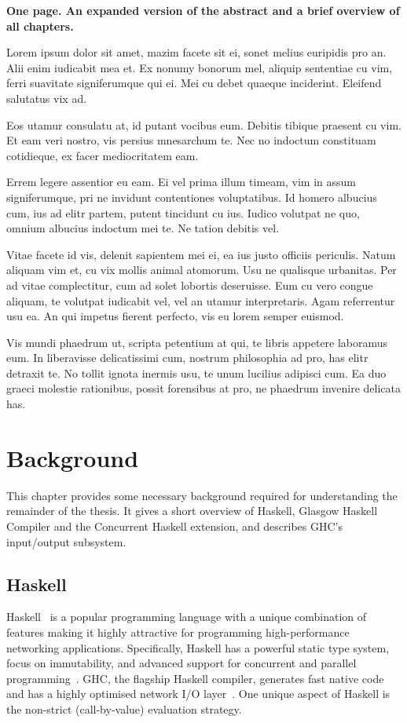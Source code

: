 \documentclass[a4paper,11pt,oneside]{report}
\begin{document}
\textbf{One page. An expanded version of the abstract and a brief overview of
  all chapters.}

Lorem ipsum dolor sit amet, mazim facete sit ei, sonet melius euripidis pro
an. Alii enim iudicabit mea et. Ex nonumy bonorum mel, aliquip sententiae cu
vim, ferri suavitate signiferumque qui ei. Mei cu debet quaeque
inciderint. Eleifend salutatus vix ad.

Eos utamur consulatu at, id putant vocibus eum. Debitis tibique praesent cu
vim. Et eam veri nostro, vis persius mnesarchum te. Nec no indoctum constituam
cotidieque, ex facer mediocritatem eam.

Errem legere assentior eu eam. Ei vel prima illum timeam, vim in assum
signiferumque, pri ne invidunt contentiones voluptatibus. Id homero albucius
cum, ius ad elitr partem, putent tincidunt cu ius. Iudico volutpat ne quo,
omnium albucius indoctum mei te. Ne tation debitis vel.

Vitae facete id vis, delenit sapientem mei ei, ea ius justo officiis
periculis. Natum aliquam vim et, cu vix mollis animal atomorum. Usu ne qualisque
urbanitas. Per ad vitae complectitur, cum ad solet lobortis deseruisse. Eum cu
vero congue aliquam, te volutpat iudicabit vel, vel an utamur
interpretaris. Agam referrentur usu ea. An qui impetus fierent perfecto, vis eu
lorem semper euismod.

Vis mundi phaedrum ut, scripta petentium at qui, te libris appetere laboramus
eum. In liberavisse delicatissimi cum, nostrum philosophia ad pro, has elitr
detraxit te. No tollit ignota inermis usu, te unum lucilius adipisci cum. Ea duo
graeci molestie rationibus, possit forensibus at pro, ne phaedrum invenire
delicata has.


\chapter{Background}

This chapter provides some necessary background required for understanding the
remainder of the thesis. It gives a short overview of Haskell, Glasgow Haskell
Compiler and the Concurrent Haskell extension, and describes GHC's input/output
subsystem.

\section{Haskell}

Haskell~\cite{bib:haskell2010} is a popular programming language with a unique
combination of features making it highly attractive for programming
high-performance networking applications. Specifically, Haskell has a powerful
static type system, focus on immutability, and advanced support for concurrent
and parallel programming~\cite{bib:marlow2013}. GHC, the flagship Haskell
compiler, generates fast native code and has a highly optimised network I/O
layer~\cite{bib:voellmy}. One unique aspect of Haskell is the non-strict
(call-by-value) evaluation strategy.
\end{document}
